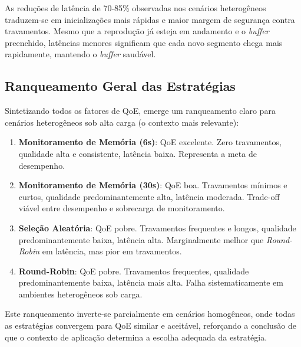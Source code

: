As reduções de latência de 70-85\% observadas nos cenários heterogêneos traduzem-se em inicializações mais rápidas e maior margem de segurança contra travamentos. Mesmo que a reprodução já esteja em andamento e o \textit{buffer} preenchido, latências menores significam que cada novo segmento chega mais rapidamente, mantendo o \textit{buffer} saudável.

\subsection{Ranqueamento Geral das Estratégias}

Sintetizando todos os fatores de QoE, emerge um ranqueamento claro para cenários heterogêneos sob alta carga (o contexto mais relevante):

\begin{enumerate}
    \item \textbf{Monitoramento de Memória (6s)}: QoE excelente. Zero travamentos, qualidade alta e consistente, latência baixa. Representa a meta de desempenho.
    
    \item \textbf{Monitoramento de Memória (30s)}: QoE boa. Travamentos mínimos e curtos, qualidade predominantemente alta, latência moderada. Trade-off viável entre desempenho e sobrecarga de monitoramento.
    
    \item \textbf{Seleção Aleatória}: QoE pobre. Travamentos frequentes e longos, qualidade predominantemente baixa, latência alta. Marginalmente melhor que \textit{Round-Robin} em latência, mas pior em travamentos.
    
    \item \textbf{Round-Robin}: QoE pobre. Travamentos frequentes, qualidade predominantemente baixa, latência mais alta. Falha sistematicamente em ambientes heterogêneos sob carga.
\end{enumerate}

Este ranqueamento inverte-se parcialmente em cenários homogêneos, onde todas as estratégias convergem para QoE similar e aceitável, reforçando a conclusão de que o contexto de aplicação determina a escolha adequada da estratégia.


